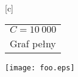 \documentclass{article}
\begin{document}
\pagestyle{empty}
[c]{\begin{tabular}{@{}l@{}}
   $C = 10~000$\\
   Graf pełny
\end{tabular}}
\texttt{[image: foo.eps]}
\end{document}
